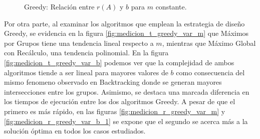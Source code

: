 \begin{figure}[h]
\begin{minipage}{0.45\textwidth}
        \caption{Greedy: Relación entre $r(A)$ y $b$ para $m$ constante.}
        \label{fig:medicion_r_pl_var_b}
    \end{minipage}
\end{figure}

Por otra parte, al examinar los algoritmos que emplean la estrategia de diseño Greedy, se evidencia en la figura \ref{fig:medicion_t_greedy_var_m} que Máximos por Grupos tiene una tendencia lineal respecto a $m$, mientras que Máximo Global con Recálculo, una tendencia polinomial. En la figura \ref{fig:medicion_t_greedy_var_b} podemos ver que la complejidad de ambos algoritmos tiende a ser lineal para mayores valores de $b$ como consecuencia del mismo fenomeno observado en Backtracking donde se generan mayores intersecciones entre los grupos. Asimismo, se destaca una marcada diferencia en los tiempos de ejecución entre los dos algoritmos Greedy. A pesar de que el primero es más rápido, en las figuras \ref{fig:medicion_r_greedy_var_m} y \ref{fig:medicion_r_greedy_var_b_1} se expone que el segundo se acerca más a la solución óptima en todos los casos estudiados.

